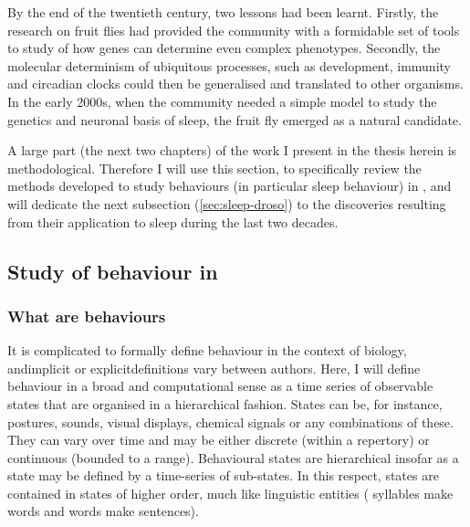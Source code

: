 By the end of the twentieth century, two lessons had been learnt.
Firstly, the research on fruit flies had provided the community with a formidable set of tools to study of how genes can determine even complex phenotypes.
Secondly,  the molecular determinism of ubiquitous processes, such as development, immunity and circadian clocks could then be generalised and translated to other organisms.
In the early 2000s, when the community needed a simple model to study the genetics and neuronal basis of sleep\cite{hendricks_need_2000}, the fruit fly emerged as a natural candidate\cite{hendricks_rest_2000, shaw_correlates_2000}.

A large part (the next two chapters) of the work I present in the thesis herein is methodological.
Therefore I will use this section, to specifically review the methods developed to study behaviours (in particular sleep behaviour) in \droso{}, 
and will dedicate the next subsection (\ref{sec:sleep-droso}) to the discoveries resulting from their application to sleep during the last two decades.


\subsection{Study of behaviour in \droso{}}

\subsubsection{What are behaviours}
It is complicated to formally define behaviour in the context of biology, and\emd{}implicit or explicit\emd{}definitions vary between authors\cite{reiser_ethomics_2009,anderson_toward_2014,egnor_computational_2016, brown_ethology_2018, berman_measuring_2018}. 
Here, I will define behaviour in a broad and computational sense as 
a time series of observable states that are organised in a hierarchical fashion.
States can be, for instance, postures, sounds, visual displays, chemical signals or any combinations of these.
They can vary over time and may be either discrete (within a repertory) or continuous (bounded to a range).
Behavioural states are hierarchical insofar as a state may be defined by a time-series of sub-states\cite{berman_measuring_2018}.
In this respect, states are contained in states of higher order, much like linguistic entities (\eg{} syllables 
make words and words make sentences)\cite{richard_hierachical_1976, dawkins1976hierarchical,berman_predictability_2016,gomez-marin_hierarchical_2016}.

